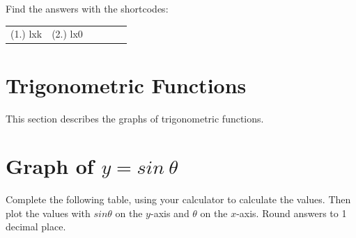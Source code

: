           

        
      
    
    \label{m39348*eip-714}
\par {} Find the answers with the shortcodes:
 \par \begin{tabular}[h]{cccccc}
 (1.) lxk  &  (2.) lx0  & \end{tabular}

  

   \label{m39414*cid7}
            \section{Trigonometric Functions}
            \nopagebreak
            
      
      \label{m39414*id83471}This section describes the graphs of trigonometric functions.\par 
      \label{m39414*uid30}
            \section{ Graph of $y=sin~\theta $}
            \nopagebreak
            

             \label{m39414*uid0983}Complete the following table, using your calculator to calculate the values. Then plot the values with \begin{math}sin\theta \end{math} on the \begin{math}y\end{math}-axis and \begin{math}\theta \end{math} on the \begin{math}x\end{math}-axis. Round answers to 1 decimal place.\par 
        
    
